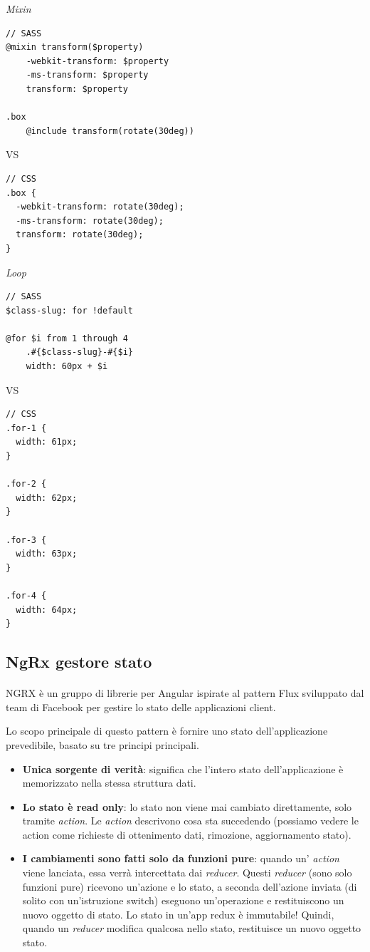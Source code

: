 \textit{Mixin}

\begin{lstlisting}
// SASS
@mixin transform($property) 
    -webkit-transform: $property
    -ms-transform: $property
    transform: $property

.box
    @include transform(rotate(30deg))   
\end{lstlisting}
VS
\begin{lstlisting}
// CSS
.box {
  -webkit-transform: rotate(30deg);
  -ms-transform: rotate(30deg);
  transform: rotate(30deg);
}
\end{lstlisting}

\textit{Loop}
\begin{lstlisting}
// SASS
$class-slug: for !default

@for $i from 1 through 4
    .#{$class-slug}-#{$i}
    width: 60px + $i
\end{lstlisting}
VS
\begin{lstlisting}
// CSS
.for-1 {
  width: 61px;
}

.for-2 {
  width: 62px;
}

.for-3 {
  width: 63px;
}

.for-4 {
  width: 64px;
}
\end{lstlisting}
      

\subsection{NgRx gestore stato}
\paragraph{}
NGRX è un gruppo di librerie per Angular ispirate al pattern Flux sviluppato dal team di Facebook per gestire
lo stato delle applicazioni client.

Lo scopo principale di questo pattern è fornire uno stato dell'applicazione prevedibile, basato su tre principi principali.

\begin{itemize}
    \item \textbf{Unica sorgente di verità}: significa che l'intero stato dell'applicazione è memorizzato nella
    stessa struttura dati.
    \item \textbf{Lo stato è read only}: lo stato non viene mai cambiato direttamente, 
    solo tramite \textit{action}. Le \textit{action} descrivono cosa sta succedendo (possiamo vedere le action
    come richieste di ottenimento dati, rimozione, aggiornamento stato).
    \item \textbf{I cambiamenti sono fatti solo da funzioni pure}: quando un' \textit{action} viene lanciata, essa verrà
    intercettata dai \textit{reducer}.
    Questi \textit{reducer} (sono solo funzioni pure) ricevono un'azione e lo stato, a seconda dell'azione inviata 
    (di solito con un'istruzione switch) eseguono un'operazione e restituiscono un nuovo oggetto di stato. 
    Lo stato in un'app redux è immutabile! Quindi, quando un \textit{reducer} modifica qualcosa nello stato, 
    restituisce un nuovo oggetto stato.
\end{itemize}

